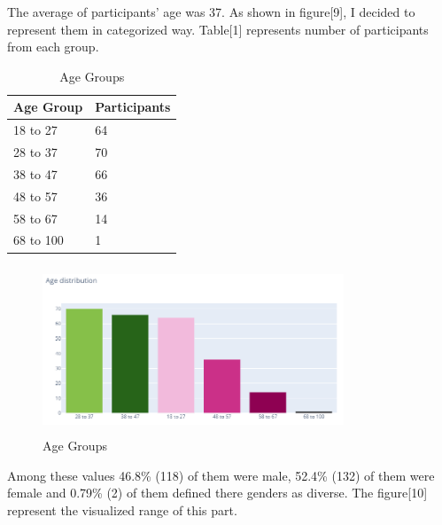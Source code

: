 \documentclass[letterpaper, 10 pt, conference]{ieeeconf}
\begin{document}
The average of participants’ age was 37. As shown in figure[9], I decided to represent them in categorized way. Table[1] represents number of participants from each group. \\

\begin{table}[!ht]
\begin{tabular}{ | m{4cm} | m{3.8cm}| }
\hline
Age Group & Participants \\ \hline
18 to 27  & 64           \\ \hline
28 to 37  & 70           \\ \hline
38 to 47  & 66           \\ \hline
48 to 57  & 36           \\ \hline
58 to 67  & 14           \\ \hline
68 to 100 & 1            \\ \hline
\end{tabular}
\caption{\label{table}Age Groups}
\end{table}

\begin{figure}[!ht]
    \centering
    \includegraphics[width = 9cm, height = 5cm]{Picture9.png}
    \caption{Age Groups}
\end{figure}


Among these values 46.8\% (118) of them were male, 52.4\% (132) of them were female and 0.79\% (2) of them defined there genders as diverse. The figure[10] represent the visualized range of this part.
\end{document}
